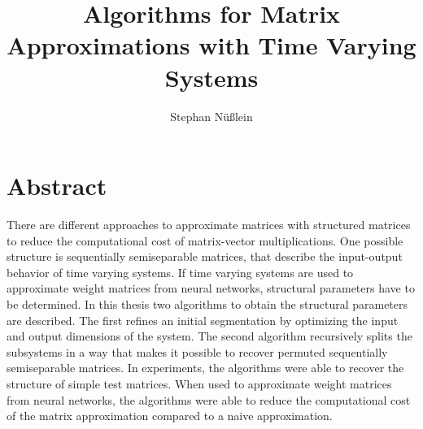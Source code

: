 \documentclass[numbers=noenddot,doctype=mastersthesis,BCOR=15mm,biblatex]{ldvbook}%
\begin{document}
\title{Algorithms for Matrix Approximations with Time Varying Systems}
%
\author{Stephan Nüßlein}


\maketitle[frontcover=Design1]


\chapter*{Abstract}
There are different approaches to approximate matrices with structured matrices to reduce the computational cost of matrix-vector multiplications.%
One possible structure is  sequentially semiseparable matrices, that describe the input-output behavior of time varying systems.
If time varying systems are used to approximate weight matrices from neural networks, structural parameters have to be determined.
In this thesis two algorithms to obtain the structural parameters are described.
The first refines an initial segmentation by optimizing the input and output dimensions of the system.
The second algorithm recursively splits the subsystems in a way that makes it possible to recover permuted sequentially semiseparable matrices.
In experiments, the algorithms were able to recover the structure of simple test matrices.
When used to approximate weight matrices from neural networks, the algorithms were able to reduce the computational cost of the matrix approximation compared to a naive approximation.


\end{document}

